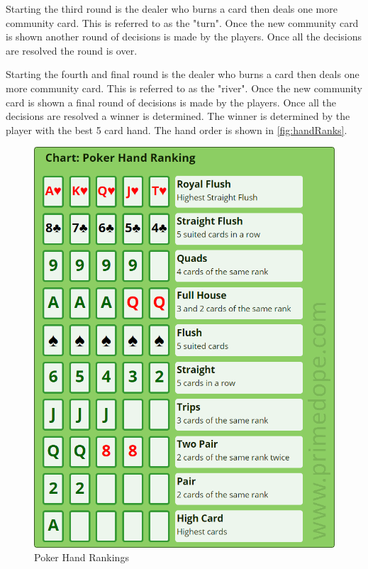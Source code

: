 Starting the third round is the dealer who burns a card then deals one more community card. This is referred to as the "turn". Once the new community card is shown another round of decisions is made by the players. Once all the decisions are resolved the round is over.

Starting the fourth and final round is the dealer who burns a card then deals one more community card. This is referred to as the "river". Once the new community card is shown a final round of decisions is made by the players. Once all the decisions are resolved a winner is determined. The winner is determined by the player with the best 5 card hand. The hand order is shown in \autoref{fig:handRanks}. 

\begin{figure}[H]
    \centering
    \includegraphics[scale=0.5]{resources/Official-Poker-Hand-Rankings-Chart.png}
    \caption{Poker Hand Rankings}
    \label{fig:handRanks}
\end{figure}

